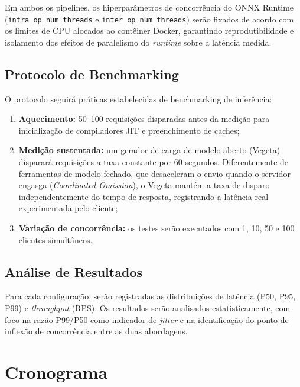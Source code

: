 \documentclass[12pt,a4paper]{article}
\renewcommand{\cite}{\supercite}
\begin{document}
Em ambos os pipelines, os hiperparâmetros de concorrência do ONNX Runtime (\texttt{intra\allowbreak\_op\allowbreak\_num\allowbreak\_threads} e \texttt{inter\allowbreak\_op\allowbreak\_num\allowbreak\_threads}) serão fixados de acordo com os limites de CPU alocados ao contêiner Docker, garantindo reprodutibilidade e isolamento dos efeitos de paralelismo do \textit{runtime} sobre a latência medida.

\subsection{Protocolo de Benchmarking}

O protocolo seguirá práticas estabelecidas de benchmarking de inferência:\cite{tene2015,reddi2020}

\begin{enumerate}
  \item \textbf{Aquecimento:} 50--100 requisições disparadas antes da medição para inicialização de compiladores JIT e preenchimento de caches;
  \item \textbf{Medição sustentada:} um gerador de carga de modelo aberto (Vegeta)\cite{vegeta2024} disparará requisições a taxa constante por 60 segundos. Diferentemente de ferramentas de modelo fechado, que desaceleram o envio quando o servidor engasga (\textit{Coordinated Omission})\cite{tene2015}, o Vegeta mantém a taxa de disparo independentemente do tempo de resposta, registrando a latência real experimentada pelo cliente;
  \item \textbf{Variação de concorrência:} os testes serão executados com 1, 10, 50 e 100 clientes simultâneos.
\end{enumerate}

\subsection{Análise de Resultados}

Para cada configuração, serão registradas as distribuições de latência (P50, P95, P99) e \textit{throughput} (RPS). Os resultados serão analisados estatisticamente, com foco na razão P99/P50 como indicador de \textit{jitter} e na identificação do ponto de inflexão de concorrência entre as duas abordagens.

\newpage
\section{Cronograma}
\end{document}
